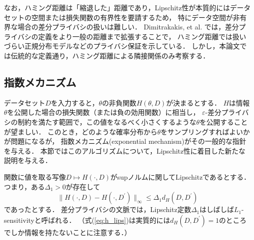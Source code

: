 \documentclass{jarticle}
\theoremstyle{definition}
\begin{document}
なお，ハミング距離は「縮退した」距離であり，Lipschitz性が本質的にはデータセットの空間または損失関数の有界性を要請するため，
特にデータ空間が非有界な場合の差分プライバシの扱いは難しい．
Dimitrakakis, et al. \cite{Dimitrakakis2014}では，差分プライバシの定義をより一般の距離まで拡張することで，
ハミング距離では扱いづらい正規分布モデルなどのプライバシ保証を示している．
しかし，本論文では伝統的な定義通り，ハミング距離による隣接関係のみ考察する．

\subsection{指数メカニズム}

データセット$D$を入力すると，$\theta$の非負関数$H(\theta, D)$が決まるとする．
$H$は情報$\theta$を公開した場合の損失関数（または負の効用関数）に相当し，
$\varepsilon$-差分プライバシの制約を満たす範囲で，この値をなるべく小さくするような$\theta$を公開することが望ましい．
このとき，どのような確率分布から$\theta$をサンプリングすればよいかが問題になるが，
指数メカニズム(exponential mechanism)\cite{McSherry2007}がその一般的な指針を与える．
本節ではこのアルゴリズムについて，Lipschitz性に着目した新たな説明を与える．

関数に値を取る写像$D \mapsto H(\cdot, D)$がsupノルムに関してLipschitzであるとする．
つまり，ある$\Delta_1>0$が存在して
\begin{equation}
\parallel H(\cdot, D) - H(\cdot, D^\prime) \parallel_\infty
\leq \Delta_1 d_H(D, D^\prime)
\label{eq:h_lips}
\end{equation}
であったとする．
差分プライバシの文脈では，Lipschitz定数$\Delta_1$はしばしば$L_1$-sensitivityと呼ばれる．
（式(\ref{eq:h_lips})は実質的には$d_H(D, D^\prime)=1$のところでしか情報を持たないことに注意する．）
\end{document}
